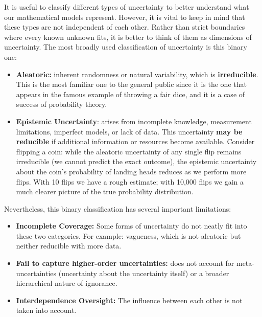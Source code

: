 \begin{definition}
    \cite{UncertaintySciences}
\end{definition}

It is useful to classify different types of uncertainty to better understand what our mathematical models represent. However, it is vital to keep in mind that these types are not independent of each other. Rather than strict boundaries where every known unknown fits, it is better to think of them as dimensions of uncertainty. The most broadly used classification of uncertainty is this binary one:

\begin{itemize}
    \item \textbf{Aleatoric:} inherent randomness or natural variability, which is \textbf{irreducible}. This is the most familiar one to the general public since it is the one that appears in the famous example of throwing a fair dice, and it is a case of success of probability theory.
    \item \textbf{Epistemic Uncertainty}: arises from incomplete knowledge, measurement limitations, imperfect models, or lack of data. This uncertainty \textbf{may be reducible} if additional information or resources become available. Consider flipping a coin: while the aleatoric uncertainty of any single flip remains irreducible (we cannot predict the exact outcome), the epistemic uncertainty about the coin's probability of landing heads reduces as we perform more flips. With 10 flips we have a rough estimate; with 10,000 flips we gain a much clearer picture of the true probability distribution.
\end{itemize}

Nevertheless, this binary classification has several important limitations:

\begin{itemize}
    \item \textbf{Incomplete Coverage:} Some forms of uncertainty do not neatly fit into these two categories. For example: vagueness, which is not aleatoric but neither reducible with more data.
    \item \textbf{Fail to capture higher-order uncertainties:} does not account for meta-uncertainties (uncertainty about the uncertainty itself) or a broader hierarchical nature of ignorance.
    \item \textbf{Interdependence Oversight:} The influence between each other is not taken into account.
\end{itemize}

